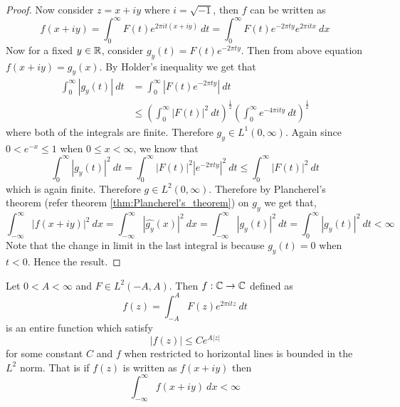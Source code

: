 \begin{proof}
  Now consider $z=x+iy$ where $i = \sqrt{-1}$, then $f$ can be written as $$f(x+iy) = \int_0^\infty F(t)e^{2\pi i t (x+iy)}\ dt = \int_0^\infty F(t)e^{-2\pi ty}e^{2\pi i tx} \ dx$$ 
  Now for a fixed $y \in \mathbb R$, consider $g_y(t) = F(t)e^{-2\pi ty}$. Then from above equation $f(x+iy) = \widehat{g_y}(x)$. By Holder's inequality we get that 
  \begin{align*}
    \int_0^\infty |g_y(t)| \ dt &= \int_0^\infty \left|F(t)e^{-2\pi ty}\right| \ dt \\
    &\le \left(\int_0^\infty \left|F(t)\right|^2 \ dt \right)^{\frac{1}{2}} \left(\int_0^\infty e^{-4\pi ity} \ dt \right)^{\frac{1}{2}}
  \end{align*}
  where both of the integrals are finite. Therefore $g_y \in L^1(0, \infty)$. Again since $0<e^{-x}\le1$ when $0\le x<\infty$, we know that $$\int_0^\infty |g_y(t)|^2 \ dt = \int_0^\infty \left|F(t)\right|^2 \left| e^{-2\pi ty} \right|^2 \ dt \le \int_0^\infty \left|F(t)\right|^2 \ dt$$
  which is again finite. Therefore $g\in L^2(0, \infty)$. Therefore by Plancherel's theorem (refer theorem \ref{thm:Plancherel's_theorem}) on $g_y$ we get that, $$\int_{-\infty}^{\infty}\left|f(x+iy)\right|^2 \ dx = \int_{-\infty}^{\infty} \left|\widehat{g_y}(x)\right|^2 \ dx= \int_{-\infty}^{\infty} \left|g_y(t)\right|^2 \ dt = \int_0^\infty \left|g_y(t)\right|^2 \ dt < \infty$$
Note that the change in limit in the last integral is because $g_y(t) = 0$ when $t < 0$. Hence the result.
\end{proof}

\begin{proposition}
  Let $0<A<\infty$ and $F \in L^2(-A, A)$. Then $f:\mathbb C \to \mathbb C$ defined as $$f(z) = \int_{-A}^A F(z)e^{2\pi itz} \ dt$$
  is an entire function which satisfy $$|f(z)| \le Ce^{A|z|}$$
  for some constant $C$ and $f$ when restricted to horizontal lines is bounded in the $L^2$ norm. That is if $f(z)$ is written as $f(x+iy)$ then  $$\int_{-\infty}^{\infty} f(x+iy) \ dx < \infty$$
\end{proposition}
